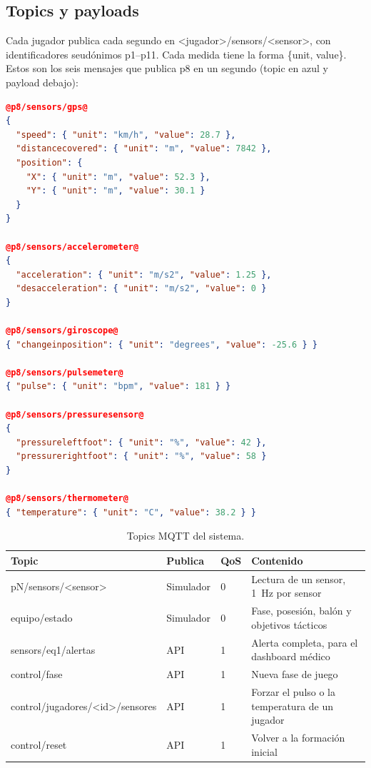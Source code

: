 \documentclass[runningheads]{llncs}
\begin{document}
\subsection{Topics y payloads}

Cada jugador publica cada segundo en <jugador>/sensors/<sensor>, con identificadores seudónimos p1--p11. Cada medida tiene la forma \{unit, value\}. Estos son los seis mensajes que publica p8 en un segundo (topic en azul y payload debajo):

\begin{lstlisting}[language=json,moredelim={[is][\color{clave}\bfseries]{@}{@}}]
@p8/sensors/gps@
{
  "speed": { "unit": "km/h", "value": 28.7 },
  "distancecovered": { "unit": "m", "value": 7842 },
  "position": {
    "X": { "unit": "m", "value": 52.3 },
    "Y": { "unit": "m", "value": 30.1 }
  }
}

@p8/sensors/accelerometer@
{
  "acceleration": { "unit": "m/s2", "value": 1.25 },
  "desacceleration": { "unit": "m/s2", "value": 0 }
}

@p8/sensors/giroscope@
{ "changeinposition": { "unit": "degrees", "value": -25.6 } }

@p8/sensors/pulsemeter@
{ "pulse": { "unit": "bpm", "value": 181 } }

@p8/sensors/pressuresensor@
{
  "pressureleftfoot": { "unit": "%", "value": 42 },
  "pressurerightfoot": { "unit": "%", "value": 58 }
}

@p8/sensors/thermometer@
{ "temperature": { "unit": "C", "value": 38.2 } }
\end{lstlisting}

\begin{table}[!htbp]
\centering
\caption{Topics MQTT del sistema.}\label{tab:topics}
\footnotesize
\begin{tabularx}{\textwidth}{p{4.2cm}p{1.9cm}p{0.8cm}L}
\toprule
\textbf{Topic} & \textbf{Publica} & \textbf{QoS} & \textbf{Contenido} \\
\midrule
pN/sensors/<sensor> & Simulador & 0 & Lectura de un sensor, 1~Hz por sensor \\
equipo/estado & Simulador & 0 & Fase, posesión, balón y objetivos tácticos \\
sensors/eq1/alertas & API & 1 & Alerta completa, para el dashboard médico \\
control/fase & API & 1 & Nueva fase de juego \\
control/jugadores/<id>/sensores & API & 1 & Forzar el pulso o la temperatura de un jugador \\
control/reset & API & 1 & Volver a la formación inicial \\
\bottomrule
\end{tabularx}
\end{table}
\end{document}

